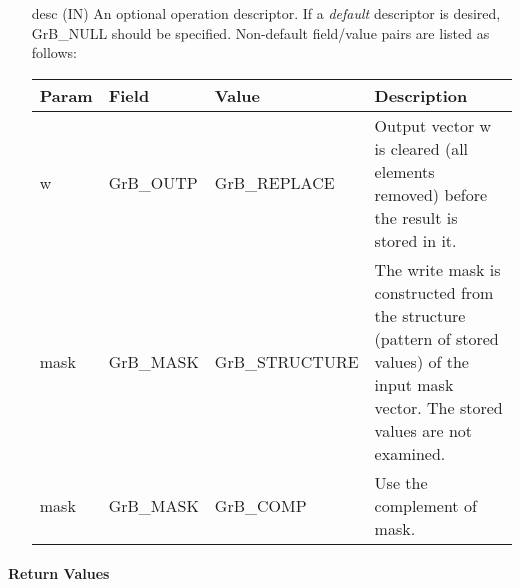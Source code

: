 \begin{itemize}[leftmargin=1.1in]
    \item[{\sf desc}] ({\sf IN}) An optional operation descriptor. If
    a \emph{default} descriptor is desired, {\sf GrB\_NULL} should be
    specified. Non-default field/value pairs are listed as follows:  \\

    \hspace*{-2em}\begin{tabular}{lllp{2.7in}}
        Param & Field  & Value & Description \\
        \hline
        {\sf w}    & {\sf GrB\_OUTP} & {\sf GrB\_REPLACE} & Output vector {\sf w}
        is cleared (all elements removed) before the result is stored in it.\\

        {\sf mask} & {\sf GrB\_MASK} & {\sf GrB\_STRUCTURE}   & The write mask is
        constructed from the structure (pattern of stored values) of the input
        {\sf mask} vector. The stored values are not examined.\\

        {\sf mask} & {\sf GrB\_MASK} & {\sf GrB\_COMP}   & Use the 
        complement of {\sf mask}. \\
    \end{tabular}
\end{itemize}

\paragraph{Return Values}

